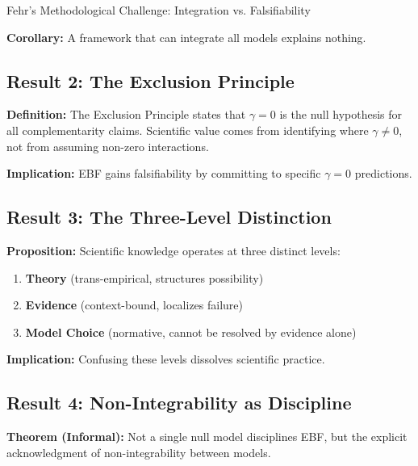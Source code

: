 \begin{chapter}{Fehr's Methodological Challenge: Integration vs. Falsifiability}
\begin{tcolorbox}[colback=gray!10!white,colframe=gray!75!black]
\textbf{Corollary:} A framework that can integrate all models explains nothing.
\end{tcolorbox}

\subsection{Result 2: The Exclusion Principle}

\begin{tcolorbox}[colback=gray!10!white,colframe=gray!75!black]
\textbf{Definition:} The Exclusion Principle states that $\gamma = 0$ is the null hypothesis for all complementarity claims. Scientific value comes from identifying where $\gamma \neq 0$, not from assuming non-zero interactions.

\textbf{Implication:} EBF gains falsifiability by committing to specific $\gamma = 0$ predictions.
\end{tcolorbox}

\subsection{Result 3: The Three-Level Distinction}

\begin{tcolorbox}[colback=gray!10!white,colframe=gray!75!black]
\textbf{Proposition:} Scientific knowledge operates at three distinct levels:
\begin{enumerate}[noitemsep]
    \item \textbf{Theory} (trans-empirical, structures possibility)
    \item \textbf{Evidence} (context-bound, localizes failure)
    \item \textbf{Model Choice} (normative, cannot be resolved by evidence alone)
\end{enumerate}

\textbf{Implication:} Confusing these levels dissolves scientific practice.
\end{tcolorbox}

\subsection{Result 4: Non-Integrability as Discipline}

\begin{tcolorbox}[colback=gray!10!white,colframe=gray!75!black]
\textbf{Theorem (Informal):} Not a single null model disciplines EBF, but the explicit acknowledgment of non-integrability between models.


\end{tcolorbox}
\end{chapter}
